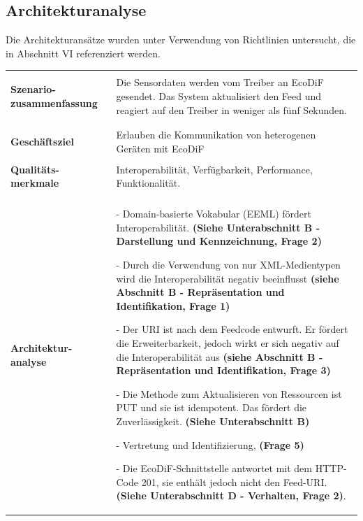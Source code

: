 \documentclass{acmsiggraph}
\begin{document}
\subsection{Architekturanalyse}
Die Architekturansätze wurden unter Verwendung von Richtlinien untersucht, die in Abschnitt VI referenziert werden.
\vspace{4px}
\begin{center}
  \label{tab:xtab}
  \begin{xtabular}{|C{2,5cm}|L{5,5cm}|} 
  \hline
  & \\[-2ex]
    \textbf{Szenario-zusammenfassung} & 
Die Sensordaten werden vom Treiber an EcoDiF gesendet. Das System aktualisiert den Feed und reagiert auf den Treiber in weniger als fünf Sekunden. \\
    & \\[-2ex]
  \hline
  & \\[-2ex]
    \textbf{Geschäftsziel} & Erlauben die Kommunikation von heterogenen Geräten mit EcoDiF \\
    \hline
    & \\[-2ex]
   \textbf{ Qualitäts-merkmale } & Interoperabilität, Verfügbarkeit, Performance, Funktionalität.
 \\ 
     \hline
       & \\[-2ex]
    \textbf{Architektur-analyse} & 
\item[-] Domain-basierte Vokabular (EEML) fördert Interoperabilität. \textbf{(Siehe Unterabschnitt B - Darstellung und Kennzeichnung, Frage 2)}
\item[-] Durch die Verwendung von nur XML-Medientypen wird die Interoperabilität negativ beeinflusst \textbf{(siehe Abschnitt B - Repräsentation und Identifikation, Frage 1)}
\item[-] Der URI ist nach dem Feedcode entwurft. Er fördert die Erweiterbarkeit, jedoch wirkt er sich negativ auf die Interoperabilität aus \textbf{(siehe Abschnitt B - Repräsentation und Identifikation, Frage 3)}
\item[-] Die Methode zum Aktualisieren von Ressourcen ist PUT und sie ist idempotent. Das fördert die Zuverlässigkeit. \textbf{(Siehe Unterabschnitt B)}
\item[-] Vertretung und Identifizierung, \textbf{(Frage 5)}
\item[-] Die EcoDiF-Schnittstelle antwortet mit dem HTTP-Code 201, sie enthält jedoch nicht den Feed-URI. \textbf{(Siehe Unterabschnitt D - Verhalten, Frage 2)}.
 \\ 

\end{xtabular}
\end{center}
\end{document}
